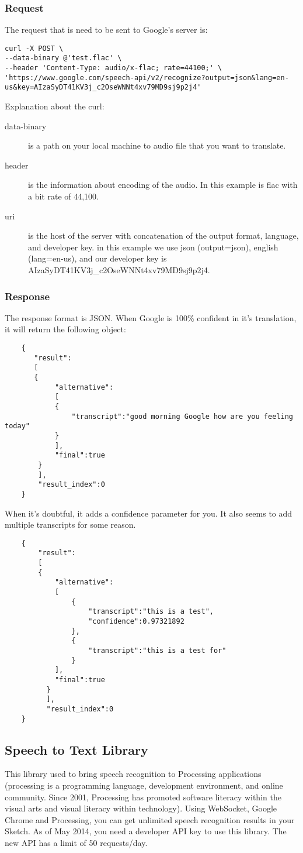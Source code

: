 \subsubsection{Request}
The request that is need to be sent to Google's server is:
\begin{lstlisting}
curl -X POST \
--data-binary @'test.flac' \
--header 'Content-Type: audio/x-flac; rate=44100;' \
'https://www.google.com/speech-api/v2/recognize?output=json&lang=en-us&key=AIzaSyDT41KV3j_c2OseWNNt4xv79MD9sj9p2j4'
\end{lstlisting}
Explanation about the curl:
\begin{description}
	\item [data-binary] is a path on your local machine to audio file that you want to translate.
	\item [header] is the information about encoding of the audio. In this example is flac with a bit rate of 44,100.
	\item [uri] is the host of the server with concatenation of the output format, language, and developer key. in this example we use json (output=json), english (lang=en-us), and our developer key is AIzaSyDT41KV3j\_c2OseWNNt4xv79MD9sj9p2j4.
\end{description}
\subsubsection{Response}
The response format is JSON. When Google is 100\% confident in it's translation, it will return the following object:
\begin{lstlisting}
	{
	   "result":
	   [
	   {
	   		"alternative":
	   		[
	   		{
	   			"transcript":"good morning Google how are you feeling today"
	   		}
	   		],
	   		"final":true
	   	}
	   	],
	   	"result_index":0
	}
\end{lstlisting}
When it's doubtful, it adds a confidence parameter for you. It also seems to add multiple transcripts for some reason.
\begin{lstlisting}
	{
		"result":
		[
		{
			"alternative":
			[
				{
					"transcript":"this is a test",
					"confidence":0.97321892
		        },
		        {
		        	"transcript":"this is a test for"
		        }
	      	],
	      	"final":true
	      }
	      ],
	      "result_index":0
	}
\end{lstlisting}
\subsection{Speech to Text Library}
This library used to bring speech recognition to Processing applications (processing is a programming language, development environment, and online community. Since 2001, Processing has promoted software literacy within the visual arts and visual literacy within technology). Using WebSocket, Google Chrome and Processing, you can get unlimited speech recognition results in your Sketch. As of May 2014, you need a developer API key to use this library. The new API has a limit of 50 requests/day.

